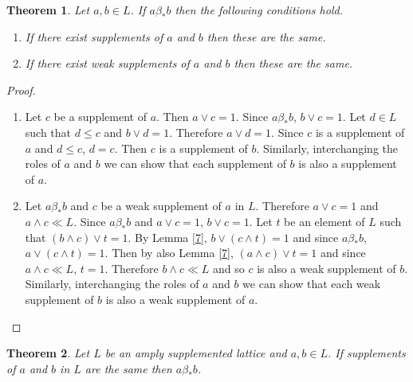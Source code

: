 \documentclass[11pt,reqno]{amsart} %
\theoremstyle{plain}
\newtheorem{theorem}{Theorem}
\theoremstyle{definition}
\theoremstyle{remark}
\numberwithin{equation}{section}
\begin{document}
\begin{theorem}\label{8}
  Let $ a,b \in L $. If $ a\beta_* b $ then the following conditions hold.
  \begin{enumerate}[label=\textnormal{(\arabic*)}]
    \item
      If there exist supplements of $ a $ and $ b $ then these are the same. \label{8.1}
    \item
      If there exist weak supplements of $ a $ and $ b $ then these are the same. \label{8.2}
  \end{enumerate}
\end{theorem}
\begin{proof}
  \begin{enumerate}
    \item
      Let $ c $ be a supplement of $ a $. Then $ a \vee c = 1 $. Since $ a \beta_* b $, $ b \vee c=1 $.
      Let $ d \in L $ such that $ d \leq c $ and $ b \vee d = 1 $. Therefore 
      $ a \vee d = 1 $. Since $ c $ is a supplement of $ a $ and $ d \leq c $, $ d = c $. Then 
      $ c $ is a supplement of $ b $. Similarly, interchanging the roles of $ a $ and $ b $ 
      we can show that each supplement of $ b $ is also a supplement of $ a $.
    \item
      Let $ a \beta_* b $ and $ c $ be a weak supplement of $ a $ in $ L $. Therefore $ a \vee c = 1 $ 
      and $ a \wedge c \ll L $. Since $ a \beta_* b $ and $ a \vee c = 1 $, $ b \vee c = 1 $. 
      Let $ t $ be an element of $ L $ such that $ (b \wedge c ) \vee t = 1 $. By Lemma \ref{7}, 
      $ b \vee ( c \wedge t )=1 $ and since $ a \beta_* b $, $ a \vee ( c \wedge t ) = 1 $. Then by also Lemma \ref{7}, $ ( a \wedge c ) \vee t = 1 $ and since $ a \wedge c \ll L $, $ t = 1 $.
      Therefore $ b \wedge c \ll L $ and so $ c $ is also a weak supplement of $ b $. 
      Similarly, interchanging the roles of $ a $ and $ b $ we can show that each weak supplement of $ b $ 
      is also a weak supplement of $ a $.
  \end{enumerate}
\end{proof}




\begin{theorem}\label{9}
  Let $ L $ be an amply supplemented lattice and $ a,b \in L $. If supplements of $ a $ and $ b $ in $ L $ 
  are the same then $ a \beta_* b $.
\end{theorem}
\end{document}
